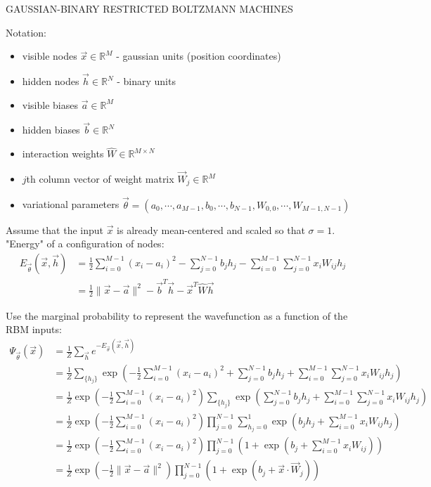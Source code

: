 \documentclass[12pt]{article}
\begin{document}
\begin{center}
\begin{large}
GAUSSIAN-BINARY RESTRICTED BOLTZMANN MACHINES
\end{large}
\end{center}

\noindent Notation:
\begin{itemize}
\item visible nodes $\vec{x}  \in \mathbb{R}^M$ - gaussian units (position coordinates)
\item hidden nodes $\vec{h} \in \mathbb{R}^N$ - binary units
\item visible biases $\vec{a} \in \mathbb{R}^M$
\item hidden biases $\vec{b} \in \mathbb{R}^N$
\item interaction weights $\hat{W} \in \mathbb{R}^{M\times N}$
\item $j$th column vector of weight matrix $\vec{W}_j \in \mathbb{R}^M$
\item variational parameters $\vec{\theta} = ( a_0, \cdots, a_{M-1},b_0,\cdots,b_{N-1}, W_{0,0},\cdots,W_{M-1,N-1} )$ \\
\end{itemize}

\noindent Assume that the input $\vec{x}$ is already mean-centered and scaled so that $\sigma = 1$. \\

\noindent "Energy" of a configuration of nodes:
\begin{align*}
E_{\vec{\theta}}(\vec{x},\vec{h}) &= \frac{1}{2} \sum_{i=0}^{M-1}(x_i - a_i)^2 - \sum_{j=0}^{N-1} b_j h_j - \sum_{i=0}^{M-1}\sum_{j=0}^{N-1} x_i W_{ij} h_j\\
&= \frac{1}{2} \| \vec{x} - \vec{a} \|^2 - \vec{b}^T \vec{h} - \vec{x}^T \hat{W} \vec{h}
\end{align*}

\noindent Use the marginal probability to represent the wavefunction as a function of the RBM inputs:
\begin{align*}
\Psi_{\vec{\theta}}(\vec{x}) &= \frac{1}{Z} \sum_{\vec{h}} e^{-E_{\vec{\theta}}(\vec{x},\vec{h})}\\
&= \frac{1}{Z} \sum_{ \{ h_j \} } \exp \left( -\frac{1}{2} \sum_{i=0}^{M-1}(x_i - a_i)^2 + \sum_{j=0}^{N-1} b_j h_j + \sum_{i=0}^{M-1}\sum_{j=0}^{N-1} x_i W_{ij} h_j  \right)\\
&=\frac{1}{Z} \exp \left( -\frac{1}{2} \sum_{i=0}^{M-1}(x_i - a_i)^2 \right) \sum_{ \{ h_j \} } \exp \left( \sum_{j=0}^{N-1} b_j h_j + \sum_{i=0}^{M-1}\sum_{j=0}^{N-1} x_i W_{ij} h_j  \right)\\
&=\frac{1}{Z} \exp \left( -\frac{1}{2} \sum_{i=0}^{M-1}(x_i - a_i)^2 \right) \prod_{j=0}^{N-1} \sum_{ h_j=0 }^1 \exp \left( b_j h_j + \sum_{i=0}^{M-1} x_i W_{ij} h_j  \right)\\
&=\frac{1}{Z} \exp \left( -\frac{1}{2} \sum_{i=0}^{M-1}(x_i - a_i)^2 \right) \prod_{j=0}^{N-1} \left( 1 + \exp \left( b_j + \sum_{i=0}^{M-1} x_i W_{ij} \right) \right)\\
&= \frac{1}{Z} \exp \left( -\frac{1}{2} \| \vec{x}-\vec{a} \|^2 \right) \prod_{j=0}^{N-1} \left( 1 + \exp \left( b_j + \vec{x} \cdot \vec{W}_j \right) \right)
\end{align*}
\end{document}
